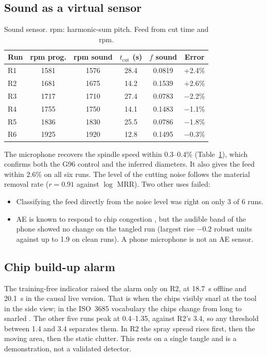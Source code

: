 \documentclass[conference,a4paper]{IEEEtran}
\begin{document}
\subsection{Sound as a virtual sensor}
\begin{table}[t]
\caption{Sound sensor. rpm: harmonic-sum pitch. Feed from cut time and rpm.}
\label{tab:audio}
\centering\small
\begin{tabular}{@{}lccccc@{}}
\toprule
Run & rpm prog. & rpm sound & $t_\mathrm{cut}$ (s) & $f$ sound & Error \\
\midrule
R1 & 1581 & 1576 & 28.4 & 0.0819 & +2.4\% \\
R2 & 1681 & 1675 & 14.2 & 0.1539 & +2.6\% \\
R3 & 1717 & 1710 & 27.4 & 0.0783 & $-$2.2\% \\
R4 & 1755 & 1750 & 14.1 & 0.1483 & $-$1.1\% \\
R5 & 1836 & 1830 & 25.5 & 0.0786 & $-$1.8\% \\
R6 & 1925 & 1920 & 12.8 & 0.1495 & $-$0.3\% \\
\bottomrule
\end{tabular}
\end{table}
The microphone recovers the spindle speed within 0.3--0.4\% (Table~\ref{tab:audio}), which confirms both the G96 control and the inferred diameters.
It also gives the feed within 2.6\% on all six runs.
The level of the cutting noise follows the material removal rate ($r=0.91$ against $\log$ MRR).
Two other uses failed:
\begin{itemize}
\item Classifying the feed directly from the noise level was right on only 3 of 6 runs.
\item AE is known to respond to chip congestion \cite{dornfeld1985}, but the audible band of the phone showed no change on the tangled run (largest rise $-0.2$ robust units against up to 1.9 on clean runs). A phone microphone is not an AE sensor.
\end{itemize}

\subsection{Chip build-up alarm}
The training-free indicator raised the alarm only on R2, at \SI{18.7}{s} offline and \SI{20.1}{s} in the causal live version.
That is when the chips visibly snarl at the tool in the side view; in the ISO~3685 vocabulary the chips change from long to snarled \cite{iso10910}.
The other five runs peak at 0.4--1.35, against R2's 3.4, so any threshold between 1.4 and 3.4 separates them.
In R2 the spray spread rises first, then the moving area, then the static clutter.
This rests on a single tangle and is a demonstration, not a validated detector.
\end{document}
